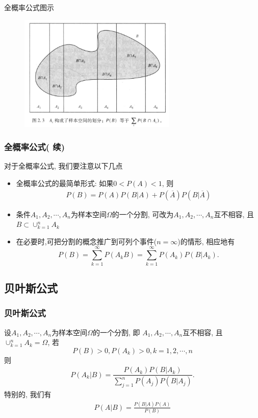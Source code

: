 \begin{frame}{全概率公式图示}
    \begin{figure}[全概率公式.png]
      \centering
      \includegraphics[width=7.5cm]{figures/全概率公式.png}
    \end{figure}

\end{frame}
\begin{frame}
  \frametitle{全概率公式( 续)}
  对于全概率公式, 我们要注意以下几点
  \begin{itemize}[<+-|alert@+>]
  \item 全概率公式的最简单形式: 如果$0<P(A)<1$, 则
    \begin{eqnarray*}
      P(B)=P(A)P(B|A)+P(\overline{A})P(B|\overline{A})
    \end{eqnarray*}
  \item 条件$A_1,A_2,\cdots,A_n$为样本空间$\Omega$的一个分割, 可改为$A_1,A_2,\cdots,A_n$互不相容, 且$B\subset \cup_{k=1}^nA_k$
  \item 在必要时,可把分割的概念推广到可列个事件($n=\infty$)的情形, 相应地有\pause
  $$ P(B)=\sum_{k=1}^{\infty} P(A_kB)=\sum_{k=1}^{\infty} P(A_k) P(B|A_k).$$
  \end{itemize}
\end{frame}



\subsection{贝叶斯公式}
\begin{frame}
	\frametitle{贝叶斯公式}
	\begin{thm}
		设$A_1,A_2,\cdots,A_n$为样本空间$\Omega$的一个分割, 即 $A_1,A_2,\cdots,A_n$互不相容, 且$\cup_{k=1}^nA_k=\Omega$, 若 $$P(B)>0, P(A_k)>0, k=1,2,\cdots,n$$ 则
		\begin{eqnarray*}
			P(A_k|B)=\dfrac{P(A_k)P(B|A_k)}{\sum_{j=1}^nP(A_j)P(B|A_j)}.
		\end{eqnarray*}
	特别的, 我们有
  \begin{eqnarray*}
    P(A|B)=\frac{P(B|A)P(A)}{P(B)}
    \end{eqnarray*}
	\end{thm}
\end{frame}



